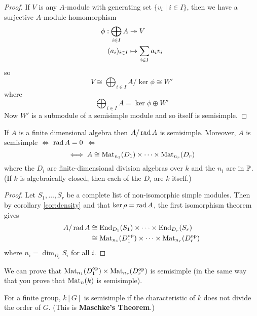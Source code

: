 \begin{proof}
	If $V$ is any $A$-module with generating set $\{v_i \mid i \in I\}$, then we have a surjective $A$-module homomorphism
    \begin{align*}
   		\phi: \bigoplus_{i \in I} A &\twoheadrightarrow V \\
        (a_i)_{i \in I} &\mapsto \sum_{i \in I} a_iv_i
    \end{align*}
    so
    \[V \cong \bigoplus_{i \in I} A/\ker\phi \cong W'\]
    where
    \[\bigoplus_{i \in I} A = \ker\phi \oplus W'\]
    Now $W'$ is a submodule of a semisimple module and so itself is semisimple.
\end{proof}

\begin{thm}
	If $A$ is a finite dimensional algebra then $A/\operatorname{rad} A$ is semisimple.
    Moreover, $A$ is semisimple $\iff$ $\operatorname{rad} A = 0$ $\iff$
    \[\iff A \cong \operatorname{Mat}_{n_1}(D_1) \times \cdots \times \operatorname{Mat}_{n_r}(D_r)\]
    where the $D_i$ are finite-dimensional division algebras over $k$ and the $n_i$ are in $\mathbb{P}$.
    (If $k$ is algebraically closed, then each of the $D_i$ are $k$ itself.)
\end{thm}

\begin{proof}
	Let $S_1,\ldots,S_r$ be a complete list of non-isomorphic simple modules.
    Then by corollary \ref{cor:density} and that $\ker\rho = \operatorname{rad} A$, the first isomorphism theorem gives
    \begin{align*}
    	A/\operatorname{rad} A &\cong \operatorname{End}_{D_1}(S_1) \times \cdots \times \operatorname{End}_{D_r}(S_r) \\
        &\cong \operatorname{Mat}_{n_1}(D_1^{\operatorname{op}}) \times \cdots \times \operatorname{Mat}_{n_r}(D_r^{\operatorname{op}})
    \end{align*}
    where $n_i = \dim_{D_i} S_i$ for all $i$.
\end{proof}

\begin{rmk}
	We can prove that $\operatorname{Mat}_{n_1}(D_1^{\operatorname{op}}) \times \operatorname{Mat}_{n_r}(D_r^{\operatorname{op}})$ is semisimple (in the same way that you prove that $\operatorname{Mat}_n(k)$ is semisimple).
\end{rmk}

\begin{rmk}
	For a finite group, $k[G]$ is semisimple if the characteristic of $k$ does not divide the order of $G$.
    (This is \textbf{Maschke's Theorem}.)
\end{rmk}